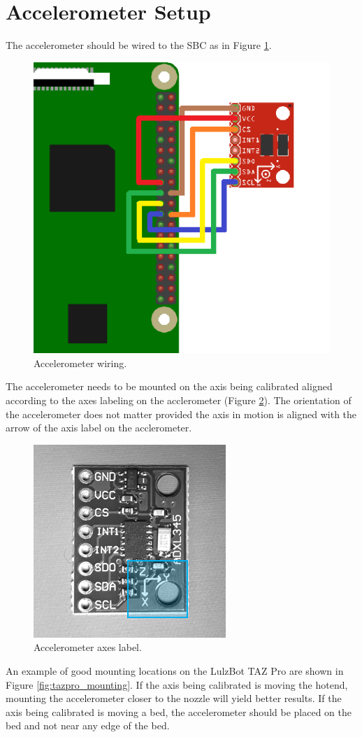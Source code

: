 \documentclass[12pt]{article}
\begin{document}
\section{Accelerometer Setup}
The accelerometer should be wired to the SBC as in Figure \ref{fig:accelerometer_wiring_old.png}.
\begin{figure}[H]
	\centering
	\includegraphics[width=0.3\linewidth]{accelerometer_wiring_old.png}
	\caption{Accelerometer wiring.}
	\label{fig:accelerometer_wiring_old.png}
\end{figure}
The accelerometer needs to be mounted on the axis being calibrated aligned according to the axes labeling on the acclerometer (Figure \ref{fig:accelerometer_axes.png}). The orientation of the accelerometer does not matter provided the axis in motion is aligned with the arrow of the axis label on the acclerometer.
\begin{figure}[H]
	\centering
	\includegraphics[width=0.3\linewidth]{accelerometer_axes.png}
	\caption{Accelerometer axes label.}
	\label{fig:accelerometer_axes.png}
\end{figure}
An example of good mounting locations on the LulzBot TAZ Pro are shown in Figure \ref{fig:tazpro_mounting}. If the axis being calibrated is moving the hotend, mounting the accelerometer closer to the nozzle will yield better results. If the axis being calibrated is moving a bed, the accelerometer should be placed on the bed and not near any edge of the bed.
\end{document}
